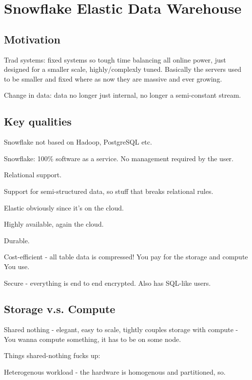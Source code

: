 \documentclass{article}
\begin{document}
	
	
	
	

\section{Snowflake Elastic Data Warehouse}

	\subsection{Motivation}
	
		Trad systems: fixed systems so tough time balancing all online power, just designed for a smaller scale, highly/complexly tuned. 
		Basically the servers used to be smaller and fixed where as now  they are massive and ever growing.
		
		Change in data: data no longer just internal, no longer a semi-constant stream.
	
	\subsection{Key qualities}
	
		Snowflake not based on Hadoop, PostgreSQL etc.
		
		Snowflake: 100\% software as a service. No management required by the user.
		
		Relational support.
		
		Support for semi-structured data, so stuff  that breaks relational rules.
		
		Elastic obviously since it's on the cloud.
		
		Highly available, again the cloud.
		
		Durable.
		
		Cost-efficient - all table data is compressed! You pay for the storage and compute You use. 
		
		Secure - everything is end to end encrypted. Also has SQL-like users.
		
	\subsection{Storage v.s. Compute}
	
		Shared nothing - elegant, easy to scale, tightly couples storage with compute - You wanna compute something, it has to be on some node.
		
		Things shared-nothing fucks up:
		
		Heterogenous workload - the hardware is homogenous and partitioned, so.
		
\end{document}
